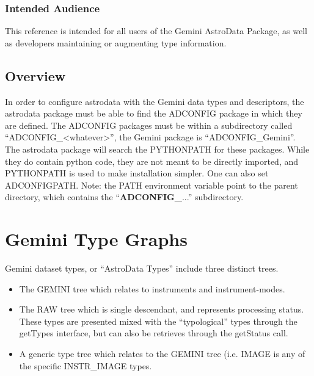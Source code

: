 \documentclass[letterpaper,10pt,english]{sphinxmanual}
\begin{document}
\subsection{Intended Audience}
\label{gatref/gen.GATREF-Audience::doc}\label{gatref/gen.GATREF-Audience:intended-audience}
This reference is intended for all users of the Gemini AstroData
Package, as well as developers maintaining or augmenting type
information.


\section{Overview}
\label{gatref/GATREF-overview:overview}\label{gatref/GATREF-overview::doc}
In order to configure astrodata with the Gemini data types and descriptors, the
astrodata package must be able to find the ADCONFIG package in which they are
defined. The ADCONFIG packages must be within a subdirectory called
``ADCONFIG\_\textless{}whatever\textgreater{}'', the Gemini package is ``ADCONFIG\_Gemini''. The astrodata
package will search the PYTHONPATH for these packages.  While they do contain
python code, they are not meant to be directly imported, and PYTHONPATH is used
to make installation simpler. One can also set ADCONFIGPATH.  Note: the PATH
environment variable point to the parent directory, which contains the
``{\color{red}\bfseries{}ADCONFIG\_}...'' subdirectory.


\chapter{Gemini Type Graphs}
\label{appendix_typegraphs:gemini-type-graphs}\label{appendix_typegraphs::doc}
Gemini dataset types, or ``AstroData Types'' include three distinct trees.
\begin{itemize}
\item {} 
The GEMINI tree which relates to instruments and instrument-modes.

\item {} 
The RAW tree which is single descendant, and represents processing status.
These types are presented mixed with the ``typological'' types through
the getTypes interface, but can also be retrieves through the getStatus call.

\item {} 
A generic type tree which relates to the GEMINI tree (i.e. IMAGE is any
of the specific INSTR\_IMAGE types.

\end{itemize}
\end{document}
